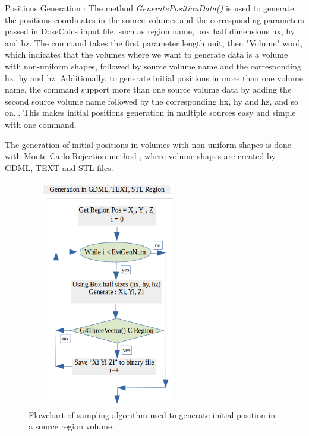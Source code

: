 \documentclass[letterpaper,12pt]{article}
\begin{document}
Positions Generation : The method \textit{GeneratePositionData()} is used to generate the positions coordinates in the source volumes and the corresponding parameters passed in DoseCalcs input file, such as region name, box half dimensions hx, hy and hz. The command takes the first parameter length unit, then "Volume" word, which indicates that the volumes where we want to generate data is a volume with non-uniform shapes, followed by source volume name and the corresponding hx, hy and hz. Additionally, to generate initial positions in more than one volume name, the command support more than one source volume data by adding the second source volume name followed by the corresponding hx, hy and hz, and so on... This makes initial positions generation in multiple sources easy and simple with one command.   

The generation of initial positions in volumes with non-uniform shapes is done with Monte Carlo Rejection method \cite{ExplorMonteCarlo}, where volume shapes are created by GDML, TEXT and STL files.

\begin{figure}[H] %
	\includegraphics[width=7cm,height=10cm]{DataGenOrganigram.png} %
    \centering
	\caption{Flowchart of sampling algorithm used to generate initial position in a source region volume.} 	
	\label{DataGenAlgoOrganigram}

\end{figure}
\end{document}
